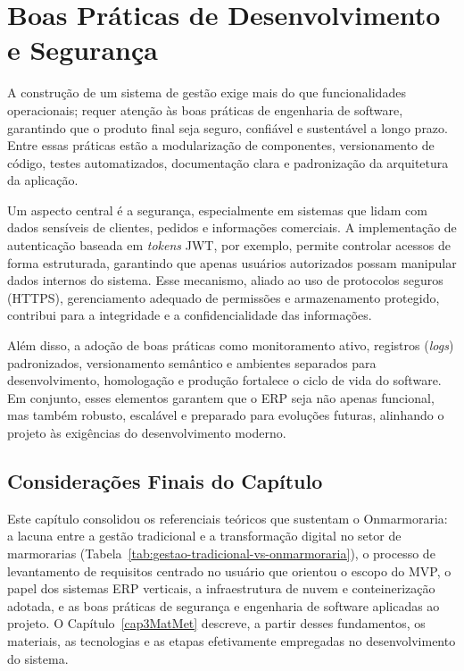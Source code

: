 \section{Boas Práticas de Desenvolvimento e Segurança}
A construção de um sistema de gestão exige mais do que funcionalidades operacionais; requer atenção às boas práticas de engenharia de software, garantindo que o produto final seja seguro, confiável e sustentável a longo prazo. Entre essas práticas estão a modularização de componentes, versionamento de código, testes automatizados, documentação clara e padronização da arquitetura da aplicação.

Um aspecto central é a segurança, especialmente em sistemas que lidam com dados sensíveis de clientes, pedidos e informações comerciais. A implementação de autenticação baseada em \textit{tokens} JWT, por exemplo, permite controlar acessos de forma estruturada, garantindo que apenas usuários autorizados possam manipular dados internos do sistema. Esse mecanismo, aliado ao uso de protocolos seguros (HTTPS), gerenciamento adequado de permissões e armazenamento protegido, contribui para a integridade e a confidencialidade das informações.

Além disso, a adoção de boas práticas como monitoramento ativo, registros (\textit{logs}) padronizados, versionamento semântico e ambientes separados para desenvolvimento, homologação e produção fortalece o ciclo de vida do software. Em conjunto, esses elementos garantem que o ERP seja não apenas funcional, mas também robusto, escalável e preparado para evoluções futuras, alinhando o projeto às exigências do desenvolvimento moderno.


\subsection*{Considerações Finais do Capítulo}

Este capítulo consolidou os referenciais teóricos que sustentam o Onmarmoraria: a lacuna entre a gestão tradicional e a transformação digital no setor de marmorarias (Tabela~\ref{tab:gestao-tradicional-vs-onmarmoraria}), o processo de levantamento de requisitos centrado no usuário que orientou o escopo do MVP, o papel dos sistemas ERP verticais, a infraestrutura de nuvem e conteinerização adotada, e as boas práticas de segurança e engenharia de software aplicadas ao projeto. O Capítulo~\ref{cap3MatMet} descreve, a partir desses fundamentos, os materiais, as tecnologias e as etapas efetivamente empregadas no desenvolvimento do sistema.
